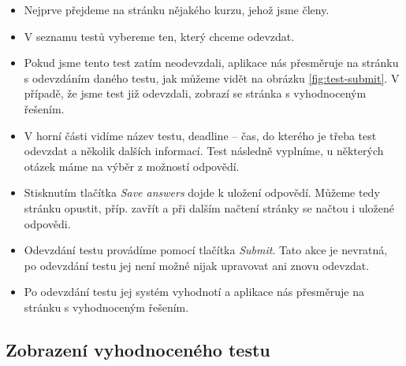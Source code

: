 \begin{itemize}
	\item Nejprve přejdeme na stránku nějakého kurzu, jehož jsme členy.
	\item V seznamu testů vybereme ten, který chceme odevzdat.
	\item Pokud jsme tento test zatím neodevzdali, aplikace nás přesměruje na stránku s odevzdáním daného testu, jak můžeme vidět na obrázku \ref{fig:test-submit}. V případě, že jsme test již odevzdali, zobrazí se stránka s vyhodnoceným řešením.
	\item V horní části vidíme název testu, deadline -- čas, do kterého je třeba test odevzdat a několik dalších informací. Test následně vyplníme, u některých otázek máme na výběr z možností odpovědí.
	\item Stisknutím tlačítka \textit{Save answers} dojde k uložení odpovědí. Můžeme tedy stránku opustit, příp. zavřít a při dalším načtení stránky se načtou i uložené odpovědi.
	\item Odevzdání testu provádíme pomocí tlačítka \textit{Submit}. Tato akce je nevratná, po odevzdání testu jej není možné nijak upravovat ani znovu odevzdat.
	\item Po odevzdání testu jej systém vyhodnotí a aplikace nás přesměruje na stránku s vyhodnoceným řešením.
\end{itemize}

\subsection{Zobrazení vyhodnoceného testu}

